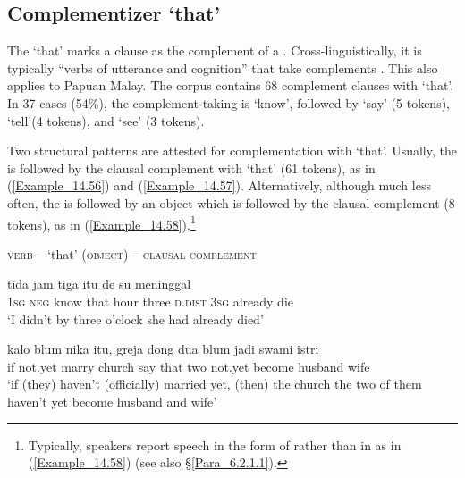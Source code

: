 \subsection{Complementizer  ‘that’}
\label{Para_14.3.1}
The   ‘that’ marks a clause as the complement of a . Cross-linguistically, it is typically  “verbs of utterance and cognition” that take complements \citep[279]{Payne.1997}. This also applies to Papuan Malay. The corpus contains 68 complement clauses with  ‘that’. In 37 cases (54\%), the complement-taking  is  ‘know’, followed by  ‘say’ (5 tokens),  ‘tell’(4 tokens), and  ‘see’ (3 tokens).

Two structural patterns are attested for complementation with  ‘that’. Usually, the  is followed by the clausal complement with  ‘that’ (61 tokens), as in (\ref{Example_14.56}) and (\ref{Example_14.57}). Alternatively, although much less often, the  is followed by an object which is followed by the clausal complement (8 tokens), as in (\ref{Example_14.58}).\footnote{Typically, speakers report speech in the form of  rather than in as in (\ref{Example_14.58}) (see also §\ref{Para_6.2.1.1}).}
%

\begin{styleExampleTitle}
\textsc{verb} –  ‘that’ (\textsc{object}) – \textsc{clausal} \textsc{complement}
\end{styleExampleTitle}
\ea\label{Example_14.56}
 {tida} {} {} {jam} {tiga} {itu} {de} {su} {meninggal}\\ %
 \textsc{1sg}  \textsc{neg}  know  that  hour  three  \textsc{d.dist}  \textsc{3sg}  already  die\\
\glt ‘I didn’t  by three o’clock she had already died’ \textstyleExampleSource{[080917-001-CvNP.0005]}
\z

\ea
\label{Example_14.57}

\gll kalo  blum  nika  itu,  greja      dong  dua blum  jadi  swami  istri\\  
if  not.yet  marry    church  say  that    two not.yet  become  husband  wife\\
\glt ‘if (they) haven’t (officially) married yet, (then) the church  the two of them haven’t yet become husband and wife’ \textstyleExampleSource{[081110-006-CvEx.0196]}
\z

